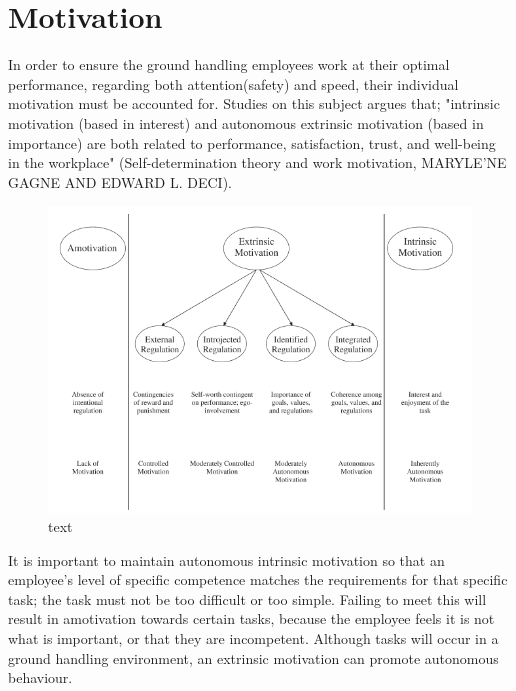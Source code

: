 \section{Motivation}

In order to ensure the ground handling employees work at their optimal performance, regarding both attention(safety) and speed, their individual motivation must be accounted for. Studies on this subject argues that; "intrinsic motivation (based in interest) and autonomous extrinsic motivation (based in importance) are both related to performance, satisfaction, trust, and well-being in the workplace" (Self-determination theory and work motivation, MARYLE'NE GAGNE AND EDWARD L. DECI).

\begin{figure}
\centering
\includegraphics[width=\textwidth]{Grafik/Motivation}
\caption{text}
\label{Hackman}
\end{figure}

It is important to maintain autonomous intrinsic motivation so that an employee's level of specific competence matches the requirements for that specific task; the task must not be too difficult or too simple. Failing to meet this will result in amotivation towards certain tasks, because the employee feels it is not what is important, or that they are incompetent. Although tasks will occur in a ground handling environment, an extrinsic motivation can promote autonomous behaviour.

